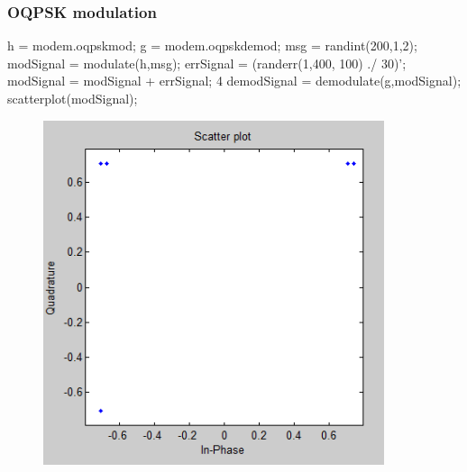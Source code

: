 \documentclass[10pt,a4paper]{article}
\begin{document}
\subsubsection{OQPSK modulation}
h = modem.oqpskmod; \newline
g = modem.oqpskdemod; \newline
msg = randint(200,1,2); \newline
modSignal = modulate(h,msg); \newline
errSignal = (randerr(1,400, 100) ./ 30)';\newline 
modSignal = modSignal + errSignal; 4 \newline
demodSignal = demodulate(g,modSignal); \newline
scatterplot(modSignal);\newline
\begin{figure}[h]
\centering
\includegraphics[width=10cm]{1_3.png} 
\end{figure}
\newpage
\FloatBarrier
\end{document}
